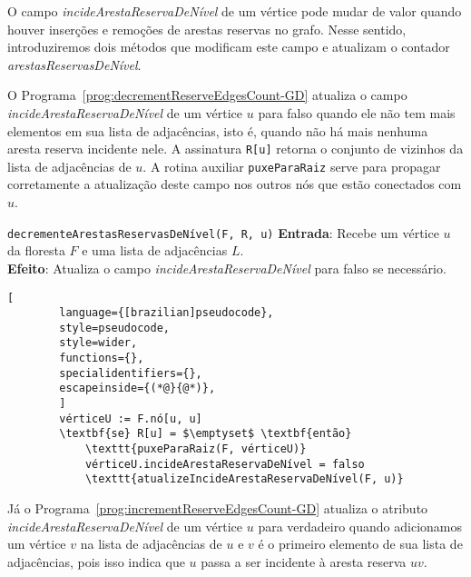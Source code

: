 O campo \textit{incideArestaReservaDeNível} de um vértice pode mudar de valor quando houver inserções e remoções de arestas reservas no grafo. Nesse sentido, introduziremos dois métodos que modificam este campo e atualizam o contador \textit{arestasReservasDeNível}.

O Programa~\ref{prog:decrementReserveEdgesCount-GD} atualiza o campo \textit{incideArestaReservaDeNível} de um vértice $u$ para falso quando ele não tem mais elementos em sua lista de adjacências, isto é, quando não há mais nenhuma aresta reserva incidente nele. A assinatura \texttt{R[u]} retorna o conjunto de vizinhos da lista de adjacências de $u$. A rotina auxiliar \texttt{puxeParaRaiz} serve para propagar corretamente a atualização deste campo nos outros nós que estão conectados com $u$.

\begin{programruledcaption}{\texttt{decrementeArestasReservasDeNível(F, R, u)} \label{prog:decrementReserveEdgesCount-GD}}
    \noindent\textbf{Entrada}: Recebe um vértice $u$ da floresta $F$ e uma lista de adjacências $L$.\\
    \noindent\textbf{Efeito}: Atualiza o campo \textit{incideArestaReservaDeNível} para falso se necessário.
    \vspace{-0.5\baselineskip}
    \begin{lstlisting}[
        language={[brazilian]pseudocode},
        style=pseudocode,
        style=wider,
        functions={},
        specialidentifiers={},
        escapeinside={(*@}{@*)},
        ]
        vérticeU := F.nó[u, u]
        \textbf{se} R[u] = $\emptyset$ \textbf{então} 
            \texttt{puxeParaRaiz(F, vérticeU)}
            vérticeU.incideArestaReservaDeNível = falso
            \texttt{atualizeIncideArestaReservaDeNível(F, u)}
    \end{lstlisting}
    \vspace{-0.5\baselineskip}
\end{programruledcaption}

Já o Programa~\ref{prog:incrementReserveEdgesCount-GD} atualiza o atributo \textit{incideArestaReservaDeNível} de um vértice $u$ para verdadeiro quando adicionamos um vértice $v$ na lista de adjacências de $u$ e $v$ é o primeiro elemento de sua lista de adjacências, pois isso indica que $u$ passa a ser incidente à aresta reserva $uv$.

